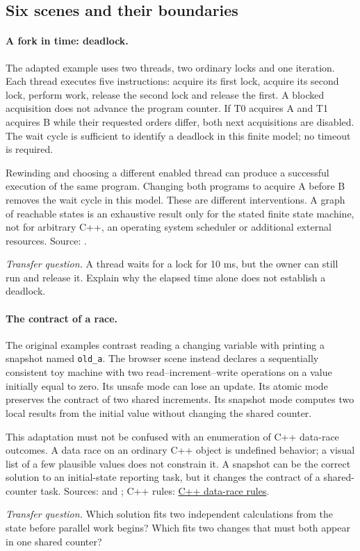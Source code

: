 {  \subsection{Six scenes and their boundaries}

  \paragraph{A fork in time: deadlock.}
  \par The adapted example uses two threads, two ordinary locks and one iteration. Each thread executes five instructions: acquire its first lock, acquire its second lock, perform work, release the second lock and release the first. A blocked acquisition does not advance the program counter. If T0 acquires A and T1 acquires B while their requested orders differ, both next acquisitions are disabled. The wait cycle is sufficient to identify a deadlock in this finite model; no timeout is required.
  \par Rewinding and choosing a different enabled thread can produce a successful execution of the same program. Changing both programs to acquire A before B removes the wait cycle in this model. These are different interventions. A graph of reachable states is an exhaustive result only for the stated finite state machine, not for arbitrary C++, an operating system scheduler or additional external resources. Source: .
  \par\textit{Transfer question.} A thread waits for a lock for 10 ms, but the owner can still run and release it. Explain why the elapsed time alone does not establish a deadlock.

  \paragraph{The contract of a race.}
  \par The original examples contrast reading a changing variable with printing a snapshot named \texttt{old\_a}. The browser scene instead declares a sequentially consistent toy machine with two read--increment--write operations on a value initially equal to zero. Its unsafe mode can lose an update. Its atomic mode preserves the contract of two shared increments. Its snapshot mode computes two local results from the initial value without changing the shared counter.
  \par This adaptation must not be confused with an enumeration of C++ data-race outcomes. A data race on an ordinary C++ object is undefined behavior; a visual list of a few plausible values does not constrain it. A snapshot can be the correct solution to an initial-state reporting task, but it changes the contract of a shared-counter task. Sources:  and ; C++ rules: \href{https://eel.is/c++draft/intro.races}{C++ data-race rules}.
  \par\textit{Transfer question.} Which solution fits two independent calculations from the state before parallel work begins? Which fits two changes that must both appear in one shared counter?

}
